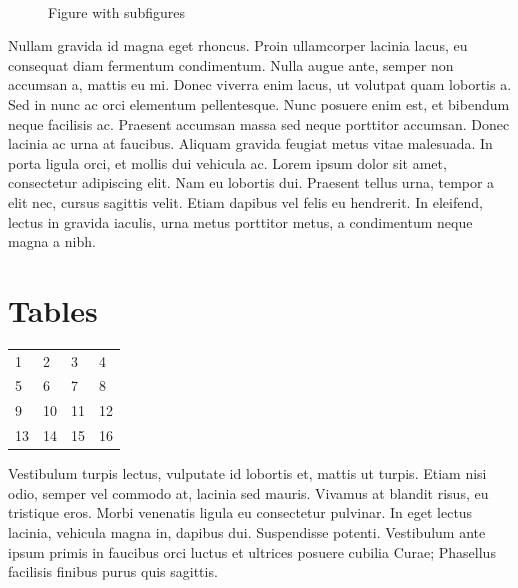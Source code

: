 \documentclass{scrartcl}
\begin{document}
\begin{figure}
\centering
{}
~
\caption{Figure with subfigures}
\end{figure}


 Nullam gravida id magna eget rhoncus. Proin ullamcorper lacinia lacus, eu consequat diam fermentum condimentum. Nulla augue ante, semper non accumsan a, mattis eu mi. Donec viverra enim lacus, ut volutpat quam lobortis a. Sed in nunc ac orci elementum pellentesque. Nunc posuere enim est, et bibendum neque facilisis ac. Praesent accumsan massa sed neque porttitor accumsan. Donec lacinia ac urna at faucibus. Aliquam gravida feugiat metus vitae malesuada. In porta ligula orci, et mollis dui vehicula ac. Lorem ipsum dolor sit amet, consectetur adipiscing elit. Nam eu lobortis dui. Praesent tellus urna, tempor a elit nec, cursus sagittis velit. Etiam dapibus vel felis eu hendrerit. In eleifend, lectus in gravida iaculis, urna metus porttitor metus, a condimentum neque magna a nibh.
 
 

\section{Tables}
\begin{tabular}{llll}
 1&2&3&4\\
 5&6&7&8\\
 9&10&11&12\\
 13&14&15&16
\end{tabular}

Vestibulum turpis lectus, vulputate id lobortis et, mattis ut turpis. Etiam nisi odio, semper vel commodo at, lacinia sed mauris. Vivamus at blandit risus, eu tristique eros. Morbi venenatis ligula eu consectetur pulvinar. In eget lectus lacinia, vehicula magna in, dapibus dui. Suspendisse potenti. Vestibulum ante ipsum primis in faucibus orci luctus et ultrices posuere cubilia Curae; Phasellus facilisis finibus purus quis sagittis.
\end{document}
